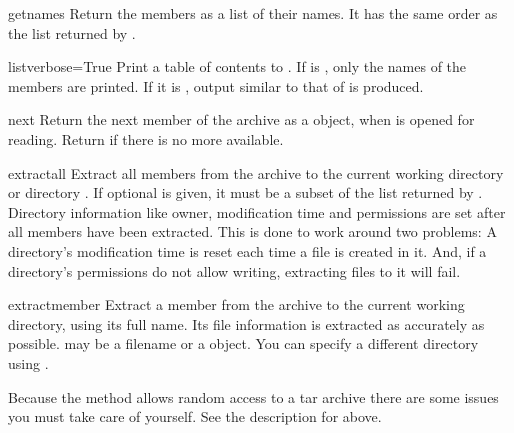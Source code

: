 \begin{methoddesc}{getnames}{}
    Return the members as a list of their names. It has the same order as
    the list returned by .
\end{methoddesc}

\begin{methoddesc}{list}{verbose=True}
    Print a table of contents to . If  is
    , only the names of the members are printed. If it is
    , output similar to that of  is produced.
\end{methoddesc}

\begin{methoddesc}{next}{}
    Return the next member of the archive as a  object, when
     is opened for reading. Return  if there is no
    more available.
\end{methoddesc}

\begin{methoddesc}{extractall}{}
    Extract all members from the archive to the current working directory
    or directory . If optional  is given, it must be
    a subset of the list returned by .
    Directory information like owner, modification time and permissions are
    set after all members have been extracted. This is done to work around two
    problems: A directory's modification time is reset each time a file is
    created in it. And, if a directory's permissions do not allow writing,
    extracting files to it will fail.
\end{methoddesc}

\begin{methoddesc}{extract}{member}
    Extract a member from the archive to the current working directory,
    using its full name. Its file information is extracted as accurately as
    possible.
     may be a filename or a  object.
    You can specify a different directory using .
    \begin{notice}
    Because the  method allows random access to a tar
    archive there are some issues you must take care of yourself. See the
    description for  above.
    \end{notice}
\end{methoddesc}

